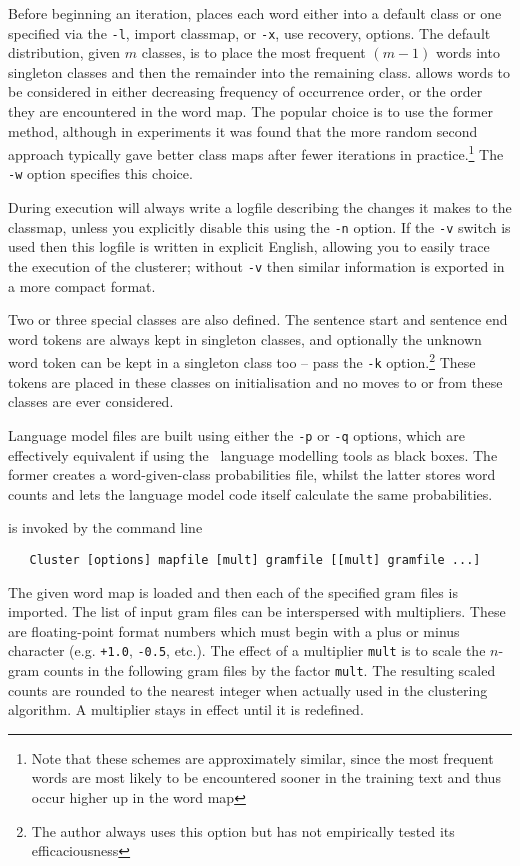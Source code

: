 Before beginning an iteration,  places each word either
into a default class or one specified via the \texttt{-l}, import
classmap, or \texttt{-x}, use recovery, options.  The default
distribution, given $m$ classes, is to place the most frequent $(m-1)$
words into singleton classes and then the remainder into the remaining
class.   allows words to be considered in either
decreasing frequency of occurrence order, or the order they are
encountered in the word map.  The popular choice is to use the former
method, although in experiments it was found that the more random
second approach typically gave better class maps after fewer
iterations in practice.\footnote{Note that these schemes are
approximately similar, since the most frequent words are most likely
to be encountered sooner in the training text and thus occur higher up
in the word map} The \texttt{-w} option specifies this choice.

During execution  will always write a logfile
describing the changes it makes to the classmap, unless you explicitly
disable this using the \texttt{-n} option.  If the \texttt{-v} switch
is used then this logfile is written in explicit English, allowing you
to easily trace the execution of the clusterer; without \texttt{-v}
then similar information is exported in a more compact format.

Two or three special classes are also defined.  The sentence start and
sentence end word tokens are always kept in singleton classes, and
optionally the unknown word token can be kept in a singleton class too
-- pass the \texttt{-k} option.\footnote{The author always uses this
option but has not empirically tested its efficaciousness} These
tokens are placed in these classes on initialisation and no moves to
or from these classes are ever considered.

Language model files are built using either the \texttt{-p} or
\texttt{-q} options, which are effectively equivalent if using
the \HTK\ language modelling tools as black boxes.  The former creates
a word-given-class probabilities file, whilst the latter stores word
counts and lets the language model code itself calculate the same
probabilities.


 is invoked by the command line
\begin{verbatim}
   Cluster [options] mapfile [mult] gramfile [[mult] gramfile ...]
\end{verbatim}
The given word map is loaded and then each of the specified gram files
is imported.  The list of input gram files can be interspersed with
multipliers. These are floating-point format numbers which must begin
with a plus or minus character (e.g. \texttt{+1.0}, \texttt{-0.5},
etc.). The effect of a multiplier \texttt{mult} is to scale the $n$-gram
counts in the following gram files by the factor \texttt{mult}. The
resulting scaled counts are rounded to the nearest integer when
actually used in the clustering algorithm. A multiplier stays in
effect until it is redefined.

